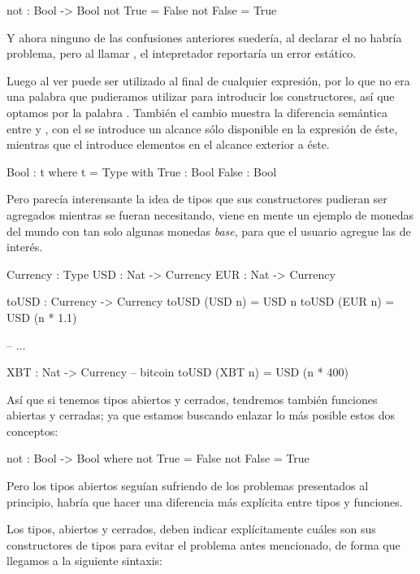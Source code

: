 \begin{blueleft}
\begin{anglercode}
not : Bool -> Bool
not True = False
not False = True
\end{anglercode}

Y ahora ninguno de las confusiones anteriores suedería, al declarar el  no habría problema, pero al llamar , el intepretador reportaría un error estático.

Luego al ver  puede ser utilizado al final de cualquier expresión, por lo que no era una palabra que pudieramos utilizar para introducir los constructores, así que optamos por la palabra . También el cambio muestra la diferencia semántica entre  y , con el  se introduce un alcance sólo disponible en la expresión de éste, mientras que el  introduce elementos en el alcance exterior a éste.

\begin{anglercode}
Bool : t where t = Type
    with
        True : Bool
        False : Bool
\end{anglercode}

Pero parecía interensante la idea de tipos que sus constructores pudieran ser agregados mientras se fueran necesitando, viene en mente un ejemplo de monedas del mundo con tan solo algunas monedas \textit{base}, para que el usuario agregue las de interés.

\begin{anglercode}
Currency : Type
USD : Nat -> Currency
EUR : Nat -> Currency

toUSD : Currency -> Currency
toUSD (USD n) = USD n
toUSD (EUR n) = USD (n * 1.1)

-- ...

XBT : Nat -> Currency   -- bitcoin
toUSD (XBT n) = USD (n * 400)
\end{anglercode}

Así que si tenemos tipos abiertos y cerrados, tendremos también funciones abiertas y cerradas; ya que estamos buscando enlazar lo más posible estos dos conceptos:

\begin{anglercode}
not : Bool -> Bool where
    not True = False
    not False = True
\end{anglercode}

Pero los tipos abiertos seguían sufriendo de los problemas presentados al principio, habría que hacer una diferencia más explícita entre tipos y funciones.

Los tipos, abiertos y cerrados, deben indicar explícitamente cuáles son sus constructores de tipos para evitar el problema antes mencionado, de forma que llegamos a la siguiente sintaxis:


\end{blueleft}

